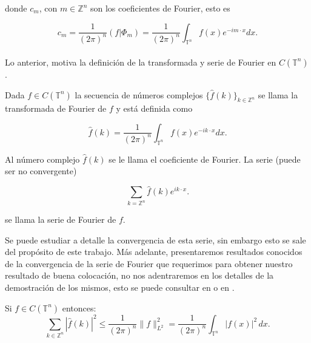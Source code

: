 \documentclass[12pt]{article}
\newcommand\Z{\ensuremath{\mathbb{Z}}}
\newcommand\T{\mathbb{T}}
\renewcommand{\hat}{\widehat}
\begin{document}
donde $c_m$, con $m\in \Z^n$ son los coeficientes de Fourier, esto es

$$c_m=\dfrac{1}{(2\pi)^n}\left(f|\Phi_m\right)=\dfrac{1}{(2\pi)^n}\int_{\T^n}f(x)e^{-im\cdot x} dx.$$\\

Lo anterior, motiva la definición de la transformada y serie de Fourier en $C(\T^n)$.


\begin{definition}
Dada $f \in C(\T^n)$ la secuencia de números complejos $\{\widehat{f}(k)\}_{k \in \mathbb{Z}^n}$ se llama la transformada de Fourier de $f$ y está definida como

$$
\widehat{f}(k)=\frac{1}{(2 \pi)^n} \int_{\T^n} f(x) e^{-i k \cdot x} d x.
$$


Al número complejo $\widehat{f}(k)$ se le llama el coeficiente de Fourier.
La serie (puede ser no convergente)

$$
\sum_{k=\Z^n} \widehat{f}(k) e^{i k \cdot x}.
$$

se llama la serie de Fourier de $f$.
\end{definition}

Se puede estudiar a detalle la convergencia de esta serie, sin embargo esto se sale del propósito de este trabajo. Más adelante, presentaremos resultados conocidos de la convergencia de la serie de Fourier que requerimos para obtener nuestro resultado de buena colocación, no nos adentraremos en los detalles de la demostración de los mismos, esto se puede consultar en \cite{grafakos2008classical} o en \cite{iorio2001fourier}.

\begin{theorem}\label{bessel}
Si $f \in C (\T^{n})$ entonces:
$$\sum_{k \in \mathbb{Z}^n} | \hat{f}(k) |^2 \leq \frac{1}{(2\pi)^n} \| f \|_{L^2}^2 = \frac{1}{(2\pi)^n} \int_{\T^n} |f(x)|^2 \, dx.$$
\end{theorem}
\end{document}
